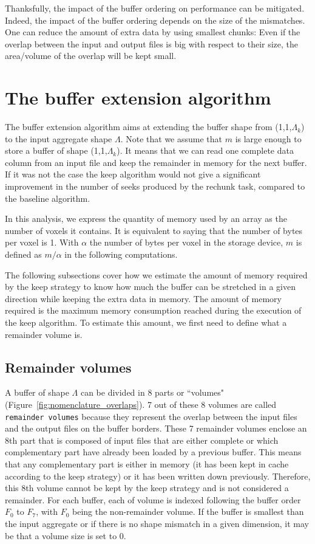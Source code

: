 \documentclass[conference]{IEEEtran}
\begin{document}
Thanksfully, the impact of the buffer ordering on performance can be
mitigated. Indeed, the impact of the buffer ordering depends on the size of the
mismatches. One can reduce the amount of extra data by using smallest chunks: Even
if the overlap between the input and output files is big with respect to their
size, the area/volume of the overlap will be kept small.

\section{The buffer extension algorithm}

The buffer extension algorithm aims at extending the buffer shape from
(1,1,$\Lambda_k$) to the input aggregate shape $\Lambda$. Note that we assume
that $m$ is large enough to store a buffer of shape (1,1,$\Lambda_k$). It means
that we can read one complete data column from an input file and keep the
remainder in memory for the next buffer. If it was not the case the keep
algorithm would not give a significant improvement in the number of seeks
produced by the rechunk task, compared to the baseline algorithm.

In this analysis, we express the quantity of memory used by an array as the
number of voxels it contains. It is equivalent to saying that the number of
bytes per voxel is 1. With $\alpha$ the number of bytes per voxel in the storage
device, $m$ is defined as $m/\alpha$ in the following computations.

The following subsections cover how we estimate the amount of memory required
by the keep strategy to know how much the buffer can be stretched in a given
direction while keeping the extra data in memory. The amount of memory required
is the maximum memory consumption reached during the execution of the keep algorithm.
To estimate this amount, we first need to define what a remainder volume is.

\subsection{Remainder volumes}

A buffer of shape $\Lambda$ can be divided in
8 parts or ``volumes" (Figure~\ref{fig:nomenclature_overlaps}).
7 out of these 8 volumes are called \texttt{remainder volumes} because
they represent the overlap between the input files and the output files on
the buffer borders. These 7 remainder volumes enclose an 8th part that is composed of
input files that are either complete or which complementary part have already
been loaded by a previous buffer. This means that any complementary part is either
in memory (it has been kept in cache according to the keep strategy) or it has
been written down previously. Therefore, this 8th volume cannot be kept by the
keep strategy and is not considered a remainder. For each buffer, each of volume
is indexed following the buffer order $F_0$ to $F_7$, with $F_0$ being the
non-remainder volume. If the buffer is smallest than the input aggregate or if
there is no shape mismatch in a given dimension, it may be that a volume size
is set to 0.
\end{document}
